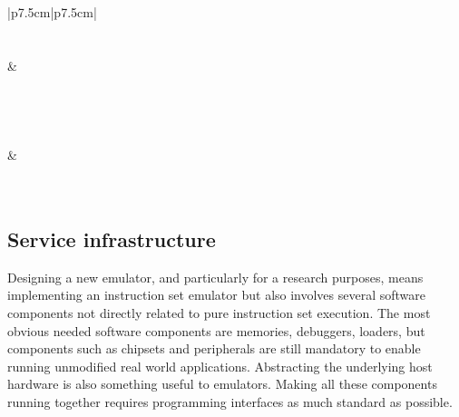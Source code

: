 \begin{center}
\begin{supertabular}{|p{7.5cm}|p{7.5cm}|}
		\\
		\\
		\\
		\hline
		 & \\
		\\
		\\
		\\
		\hline
		\hline
		\\
		\hline
		 & \\
		\\
		\\
		\hline
	\end{supertabular}
\end{center}

\subsection{Service infrastructure}
\label{tms320c3x_service_infrastructure}

Designing a new emulator, and particularly for a research purposes, means implementing an instruction set emulator but also involves several software components not directly related to pure instruction set execution.
The most obvious needed software components are memories, debuggers, loaders, but components such as chipsets and peripherals are still mandatory to enable running unmodified real world applications.
Abstracting the underlying host hardware is also something useful to emulators.
Making all these components running together requires programming interfaces as much standard as possible.

